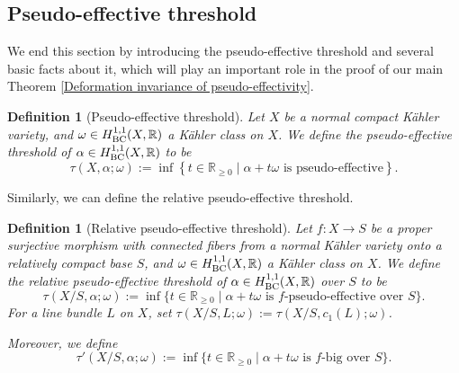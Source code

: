 \documentclass[12pt]{amsart}
\numberwithin{equation}{section}
\theoremstyle{definition}
\theoremstyle{plain}
\newtheorem{definition}  [theorem]     {Definition}
\newtheorem*{thm A*}{Theorem A}
\newtheorem*{thm B*}{Theorem B}
\newtheorem*{thm C*}{Theorem C}
\newtheorem*{thm D*}{Theorem D}
\theoremstyle{definition}
\renewcommand{\1}{\mathds{1}}
\renewcommand{\>}{\rightarrow}
\begin{document}
\subsection{Pseudo-effective threshold}
We end this section by introducing the pseudo-effective threshold and several basic facts about it, which will play an important role in the proof of our main Theorem \ref{Deformation invariance of pseudo-effectivity}.

\begin{definition}[Pseudo-effective threshold]
Let $X$ be a normal compact K\"ahler variety, and $\omega \in H^{1,1}_{\rm{BC}}(X, \mathbb{R})$ a K\"ahler class on $X$. We define the \emph{pseudo-effective threshold of} $\alpha \in H^{1,1}_{\rm{BC}}(X,\mathbb{R})$ to be $$\tau(X, \alpha; \omega):=\inf \left\{t \in \mathbb{R}_{\ge 0} \mid \alpha+t \omega \text { is pseudo-effective}\right\}.$$
\end{definition}
Similarly, we can define the relative pseudo-effective threshold. 
\begin{definition}[Relative pseudo-effective threshold]
Let $f:X\to S$ be a proper surjective morphism with connected fibers from a normal K\"ahler variety onto a relatively compact base $S$,  %
and $\omega \in H^{1,1}_{\rm{BC}}(X, \mathbb{R})$ a K\"ahler class on $X$. 
We define the \emph{relative pseudo-effective threshold} of $\alpha\in H^{1,1}_{\rm{BC}}(X,\mathbb{R})$ over $S$ to be $$\tau(X/S,\alpha ;\omega) := \inf\{t\in \mathbb{R}_{\ge 0}\mid \alpha + t \omega \text{ is }f\text{-pseudo-effective over }S\}.$$
For a line bundle $L$ on $X$, set $\tau(X/S, L ; \omega) :=  \tau(X/S, c_1(L) ; \omega)$. 

Moreover, we define
\[
\tau'(X/S, \alpha; \omega) := \inf \{ t \in \mathbb{R}_{\ge 0} \mid \alpha + t \omega \text{ is } f\text{-big over } S \}.
\] 
\end{definition}
\end{document}
